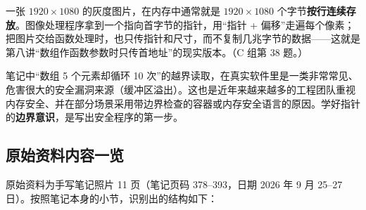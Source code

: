 \begin{sciencebox}
一张 $1920\times1080$ 的灰度图片，在内存中通常就是 $1920\times1080$ 个字节\textbf{按行连续存放}。图像处理程序拿到一个指向首字节的指针，用“指针 + 偏移”走遍每个像素；把图片交给函数处理时，也只传指针和尺寸，而不复制几兆字节的数据——这就是第八讲“数组作函数参数时只传首地址”的现实版本。（C 组第 38 题。）
\end{sciencebox}

\begin{sciencebox}
笔记中“数组 5 个元素却循环 10 次”的越界读取，在真实软件里是一类非常常见、危害很大的安全漏洞来源（缓冲区溢出）。这也是近年来越来越多的工程团队重视内存安全、并在部分场景采用带边界检查的容器或内存安全语言的原因。学好指针的\textbf{边界意识}，是写出安全程序的第一步。
\end{sciencebox}

\subsection*{原始资料内容一览}
原始资料为手写笔记照片 11 页（笔记页码 378--393，日期 2026 年 9 月 25--27 日）。按照笔记本身的小节，识别出的结构如下：

